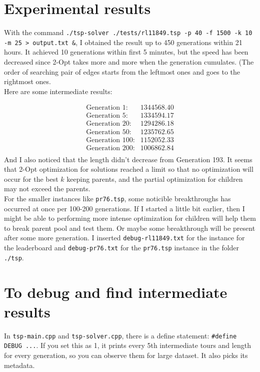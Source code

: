 \documentclass[11pt]{article}
\begin{document}
\section{Experimental results} \label{sec:3}

With the command \texttt{./tsp-solver ./tests/rl11849.tsp -p 40 -f 1500 -k 10 -m 25 > output.txt \&}, I obtained the result up to 450 generations within 21 hours. It achieved 10 generations within first 5 minutes, but the speed has been decreased since 2-Opt takes more and more when the generation cumulates. (The order of searching pair of edges starts from the leftmost ones and goes to the rightmost ones. \\
Here are some intermediate results:

\begin{align*}
	\text{Generation 1}:& 1344568.40 \\
	\text{Generation 5}:& 1334594.17 \\
	\text{Generation 20}:& 1294286.18 \\
	\text{Generation 50}:& 1235762.65 \\
	\text{Generation 100}:& 1152052.33 \\
	\text{Generation 200}:& 1006862.84 \\
\end{align*}
And I also noticed that the length didn't decrease from Generation 193. It seems that 2-Opt optimization for solutions reached a limit so that no optimization will occur for the best $k$ keeping parents, and the partial optimization for children may not exceed the parents. \\
For the smaller instances like \texttt{pr76.tsp}, some noticible breakthroughs has occurred at once per 100-200 generations. If I started a little bit earlier, then I might be able to performing more intense optimization for children will help them to break parent pool and test them. Or maybe some breakthrough will be present after some more generation.
I inserted \texttt{debug-rl11849.txt} for the instance for the leaderboard and \texttt{debug-pr76.txt} for the \texttt{pr76.tsp} instance in the folder \texttt{./tsp}.

\section{To debug and find intermediate results}
In \texttt{tsp-main.cpp} and \texttt{tsp-solver.cpp}, there is a define statement: \texttt{\#define DEBUG ...}. If you set this as 1, it prints every 5th intermediate tours and length for every generation, so you can observe them for large dataset. It also picks its metadata.
\end{document}
